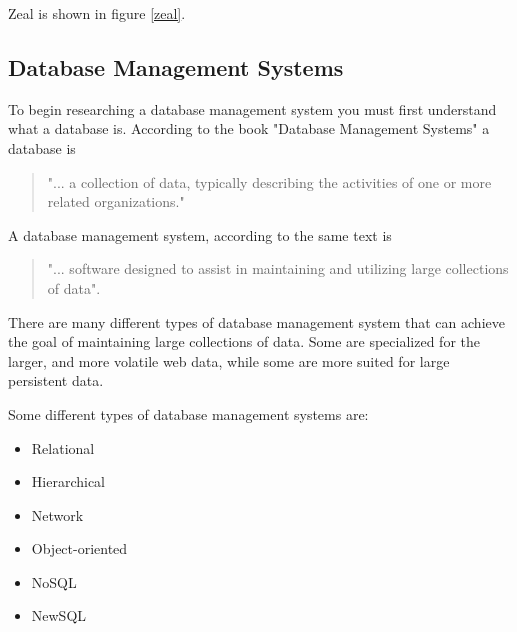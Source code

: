 \documentclass[letterpaper, 11pt]{article}
\begin{document}
Zeal is shown in figure \ref{zeal}.

\newpage


\subsection{Database Management Systems}
To begin researching a database management system you must first understand what a
database is. According to the book "Database Management Systems" a database is

\begin{quote}
"... a collection of data, typically describing the activities of one or more related
organizations."\cite{ramakrishnan2000database}
\end{quote}

A database management system, according to the same text is

\begin{quote}
"... software designed to assist in maintaining and utilizing large collections of data".
\cite{ramakrishnan2000database}
\end{quote}

There are many different types of database management system that can achieve the
goal of maintaining large collections of data. Some are specialized for the larger, and
more volatile web data, while some are more suited for large persistent data.
\par\vspace{\baselineskip}
Some different types of database management systems are:
\begin{itemize}
\item Relational
\item Hierarchical
\item Network
\item Object-oriented
\item NoSQL
\item NewSQL
\end{itemize}
\end{document}
